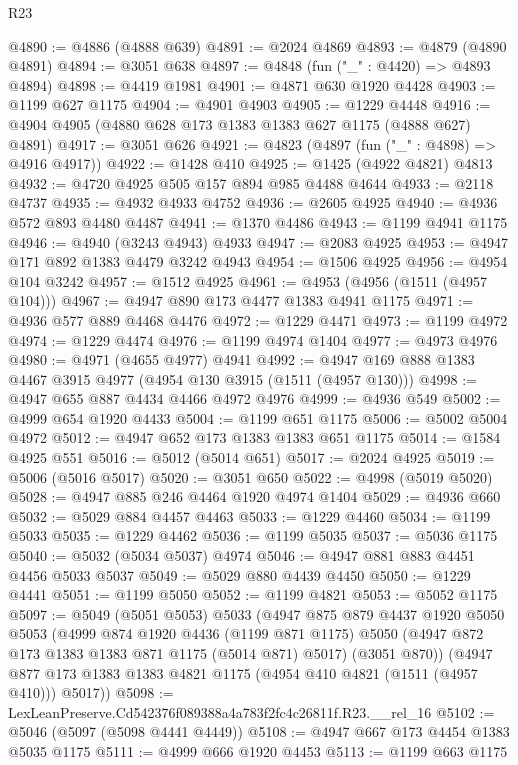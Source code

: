 \begin{lexlean}{R23}
\begin{coremodule}
@4890 := @4886 (@4888 @639)
@4891 := @2024 @4869
@4893 := @4879 (@4890 @4891)
@4894 := @3051 @638
@4897 := @4848 (fun ("_" : @4420) => @4893 @4894)
@4898 := @4419 @1981
@4901 := @4871 @630 @1920 @4428
@4903 := @1199 @627 @1175
@4904 := @4901 @4903
@4905 := @1229 @4448
@4916 := @4904 @4905 (@4880 @628 @173 @1383 @1383 @627 @1175 (@4888 @627) @4891)
@4917 := @3051 @626
@4921 := @4823 (@4897 (fun ("_" : @4898) => @4916 @4917))
@4922 := @1428 @410
@4925 := @1425 (@4922 @4821) @4813
@4932 := @4720 @4925 @505 @157 @894 @985 @4488 @4644
@4933 := @2118 @4737
@4935 := @4932 @4933 @4752
@4936 := @2605 @4925
@4940 := @4936 @572 @893 @4480 @4487
@4941 := @1370 @4486
@4943 := @1199 @4941 @1175
@4946 := @4940 (@3243 @4943) @4933
@4947 := @2083 @4925
@4953 := @4947 @171 @892 @1383 @4479 @3242 @4943
@4954 := @1506 @4925
@4956 := @4954 @104 @3242
@4957 := @1512 @4925
@4961 := @4953 (@4956 (@1511 (@4957 @104)))
@4967 := @4947 @890 @173 @4477 @1383 @4941 @1175
@4971 := @4936 @577 @889 @4468 @4476
@4972 := @1229 @4471
@4973 := @1199 @4972
@4974 := @1229 @4474
@4976 := @1199 @4974 @1404
@4977 := @4973 @4976
@4980 := @4971 (@4655 @4977) @4941
@4992 := @4947 @169 @888 @1383 @4467 @3915 @4977 (@4954 @130 @3915 (@1511 (@4957 @130)))
@4998 := @4947 @655 @887 @4434 @4466 @4972 @4976
@4999 := @4936 @549
@5002 := @4999 @654 @1920 @4433
@5004 := @1199 @651 @1175
@5006 := @5002 @5004 @4972
@5012 := @4947 @652 @173 @1383 @1383 @651 @1175
@5014 := @1584 @4925 @551
@5016 := @5012 (@5014 @651)
@5017 := @2024 @4925
@5019 := @5006 (@5016 @5017)
@5020 := @3051 @650
@5022 := @4998 (@5019 @5020)
@5028 := @4947 @885 @246 @4464 @1920 @4974 @1404
@5029 := @4936 @660
@5032 := @5029 @884 @4457 @4463
@5033 := @1229 @4460
@5034 := @1199 @5033
@5035 := @1229 @4462
@5036 := @1199 @5035
@5037 := @5036 @1175
@5040 := @5032 (@5034 @5037) @4974
@5046 := @4947 @881 @883 @4451 @4456 @5033 @5037
@5049 := @5029 @880 @4439 @4450
@5050 := @1229 @4441
@5051 := @1199 @5050
@5052 := @1199 @4821
@5053 := @5052 @1175
@5097 := @5049
    (@5051 @5053)
    @5033
    (@4947
      @875
      @879
      @4437
      @1920
      @5050
      @5053
      (@4999
        @874
        @1920
        @4436
        (@1199 @871 @1175)
        @5050
        (@4947 @872 @173 @1383 @1383 @871 @1175 (@5014 @871) @5017)
        (@3051 @870))
      (@4947 @877 @173 @1383 @1383 @4821 @1175 (@4954 @410 @4821 (@1511 (@4957 @410))) @5017))
@5098 := LexLeanPreserve.Cd542376f089388a4a783f2fc4c26811f.R23.__rel_16
@5102 := @5046 (@5097 (@5098 @4441 @4449))
@5108 := @4947 @667 @173 @4454 @1383 @5035 @1175
@5111 := @4999 @666 @1920 @4453
@5113 := @1199 @663 @1175

\end{coremodule}
\end{lexlean}
